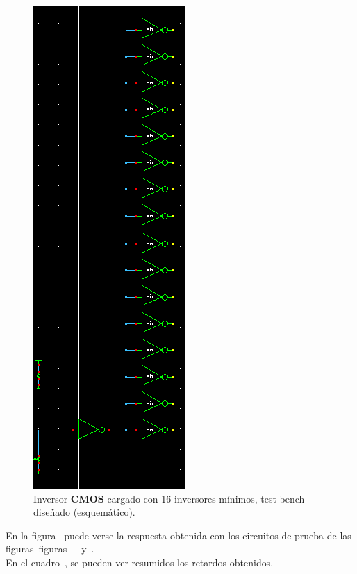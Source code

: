 \vfill
\clearpage

\begin{figure}[H] %
\begin{center}
\includegraphics[width=0.2 \textwidth, angle=0]{./img/point2/TEST_LOGIC_GATES_tb_inverter_16_response_schematic}
\caption{\label{fig:fig_inverter_16_min_load_schematic}\footnotesize{Inversor \textbf{CMOS} cargado con 16 inversores mínimos, test bench diseñado (esquemático).}}
\end{center}
\end{figure}




En la figura~ puede verse la respuesta obtenida con los circuitos de prueba de las figuras~figuras~~~y~.\\ 




En el cuadro~, se pueden ver resumidos los retardos obtenidos.



